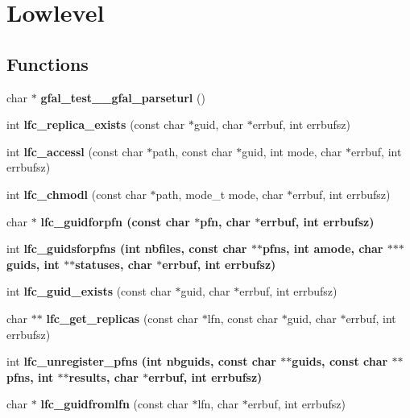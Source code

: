 \section{Lowlevel}
\label{group__lowlevel}
\subsection*{Functions}
\begin{CompactItemize}
\item 
char $\ast$ \textbf{gfal\_\-test\_\-\_\-gfal\_\-parseturl} ()\label{group__lowlevel_g9282bb70dffe20af2db91d05418ac9c5}

\item 
int \textbf{lfc\_\-replica\_\-exists} (const char $\ast$guid, char $\ast$errbuf, int errbufsz)\label{group__lowlevel_g4fa605c700ac841df98ffb1b4f2d0ecb}

\item 
int \textbf{lfc\_\-accessl} (const char $\ast$path, const char $\ast$guid, int mode, char $\ast$errbuf, int errbufsz)\label{group__lowlevel_g145e85cc530b23736eea535580c4e5e3}

\item 
int \textbf{lfc\_\-chmodl} (const char $\ast$path, mode\_\-t mode, char $\ast$errbuf, int errbufsz)\label{group__lowlevel_g45d447082c9b4e1a47684a43f198d2e4}

\item 
char $\ast$ \bf{lfc\_\-guidforpfn} (const char $\ast$pfn, char $\ast$errbuf, int errbufsz)
\item 
int \bf{lfc\_\-guidsforpfns} (int nbfiles, const char $\ast$$\ast$pfns, int amode, char $\ast$$\ast$$\ast$guids, int $\ast$$\ast$statuses, char $\ast$errbuf, int errbufsz)
\item 
int \textbf{lfc\_\-guid\_\-exists} (const char $\ast$guid, char $\ast$errbuf, int errbufsz)\label{group__lowlevel_g89af6526e8342c74f90fa2ee10cdc5fa}

\item 
char $\ast$$\ast$ \textbf{lfc\_\-get\_\-replicas} (const char $\ast$lfn, const char $\ast$guid, char $\ast$errbuf, int errbufsz)\label{group__lowlevel_g942218fc4c4fa95df2bf10db3f3fad75}

\item 
int \bf{lfc\_\-unregister\_\-pfns} (int nbguids, const char $\ast$$\ast$guids, const char $\ast$$\ast$pfns, int $\ast$$\ast$results, char $\ast$errbuf, int errbufsz)
\item 
char $\ast$ \textbf{lfc\_\-guidfromlfn} (const char $\ast$lfn, char $\ast$errbuf, int errbufsz)\label{group__lowlevel_g338e9042e72eeffa51e27beca09675c4}


\end{CompactItemize}
